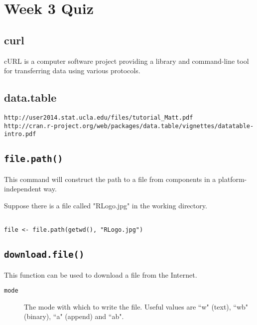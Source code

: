 \documentclass[]{article}
\begin{document}
\section{Week 3 Quiz}
\subsection*{curl}
cURL is a computer software project providing a library and command-line tool for transferring data using various protocols. 


\subsection*{data.table}
\begin{verbatim}
http://user2014.stat.ucla.edu/files/tutorial_Matt.pdf
http://cran.r-project.org/web/packages/data.table/vignettes/datatable-intro.pdf
\end{verbatim}

\subsection*{\texttt{file.path()}}

This command will construct the path to a file from components in a platform-independent way. 

Suppose there is a file called "RLogo.jpg" in the working directory.
\begin{framed}
\begin{verbatim}

file <- file.path(getwd(), "RLogo.jpg")

\end{verbatim}
\end{framed}
\subsection*{\texttt{download.file()}}

This function can be used to download a file from the Internet. 

\begin{description}
\item[\texttt{mode}] The mode with which to write the file. Useful values are ``w" (text), ``wb" (binary), ``a" (append) and ``ab".
\end{description}
\end{document}
